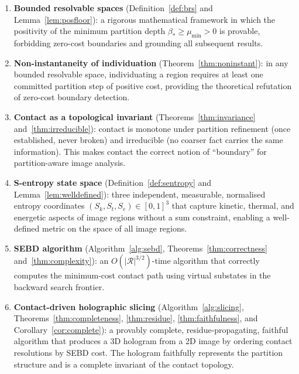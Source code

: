 \documentclass[twocolumn]{article}
\theoremstyle{plain}
\theoremstyle{definition}
\newcommand{\Sk}{S_k}
\newcommand{\St}{S_t}
\newcommand{\Se}{S_e}
\newcommand{\bstar}{\beta_*}
\newcommand{\mumin}{\mu_{\min}}
\begin{document}
\begin{enumerate}[label=(\roman*)]
\item \textbf{Bounded resolvable spaces} (Definition~\ref{def:brs} and
  Lemma~\ref{lem:posfloor}): a rigorous mathematical framework in which the
  positivity of the minimum partition depth $\bstar \geq \mumin > 0$ is provable,
  forbidding zero-cost boundaries and grounding all subsequent results.

\item \textbf{Non-instantaneity of individuation} (Theorem~\ref{thm:noninstant}):
  in any bounded resolvable space, individuating a region requires at least one
  committed partition step of positive cost, providing the theoretical refutation
  of zero-cost boundary detection.

\item \textbf{Contact as a topological invariant} (Theorems~\ref{thm:invariance}
  and~\ref{thm:irreducible}): contact is monotone under partition refinement
  (once established, never broken) and irreducible (no coarser fact carries
  the same information). This makes contact the correct notion of ``boundary''
  for partition-aware image analysis.

\item \textbf{S-entropy state space} (Definition~\ref{def:sentropy} and
  Lemma~\ref{lem:welldefined}): three independent, measurable, normalised entropy
  coordinates $(\Sk, \St, \Se) \in [0,1]^3$ that capture kinetic, thermal, and
  energetic aspects of image regions without a sum constraint, enabling a
  well-defined metric on the space of all image regions.

\item \textbf{SEBD algorithm} (Algorithm~\ref{alg:sebd}, Theorems~\ref{thm:correctness}
  and~\ref{thm:complexity}): an $O(|\mathcal{R}|^{3/2})$-time algorithm that
  correctly computes the minimum-cost contact path using virtual substates in
  the backward search frontier.

\item \textbf{Contact-driven holographic slicing} (Algorithm~\ref{alg:slicing},
  Theorems~\ref{thm:completeness}, \ref{thm:residue}, \ref{thm:faithfulness},
  and Corollary~\ref{cor:complete}): a provably complete, residue-propagating,
  faithful algorithm that produces a 3D hologram from a 2D image by ordering
  contact resolutions by SEBD cost. The hologram faithfully represents the
  partition structure and is a complete invariant of the contact topology.
\end{enumerate}
\end{document}

